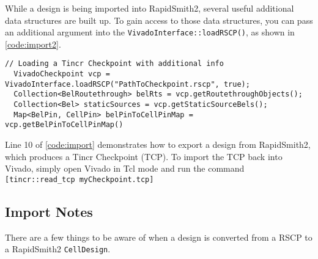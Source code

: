 \vspace{.3cm}
\noindent
While a design is being imported into RapidSmith2, several useful additional
data structures are built up. To gain access to those data structures, you can pass
an additional argument into the \texttt{VivadoInterface::loadRSCP()}, as shown
in \autoref{code:import2}.

\begin{lstlisting}[xleftmargin=1.5em, framexleftmargin=1.5em, caption=Importing
a RSCP with additional information, label=code:import2]
  // Loading a Tincr Checkpoint with additional info
  VivadoCheckpoint vcp = VivadoInterface.loadRSCP("PathToCheckpoint.rscp", true); 
  Collection<BelRoutethrough> belRts = vcp.getRoutethroughObjects();
  Collection<Bel> staticSources = vcp.getStaticSourceBels();
  Map<BelPin, CellPin> belPinToCellPinMap = vcp.getBelPinToCellPinMap()
\end{lstlisting}

\vspace{.3cm}
\noindent
Line 10 of \autoref{code:import} demonstrates how to export a design from
RapidSmith2, which produces a Tincr Checkpoint (TCP). To import the TCP back
into Vivado, simply open Vivado in Tcl mode and run the command
\texttt{[tincr::read\-\_tcp myCheckpoint.tcp]}

\subsection{Import Notes}
There are a few things to be aware of when a design is converted from a RSCP to
a RapidSmith2 \texttt{CellDesign}. 

